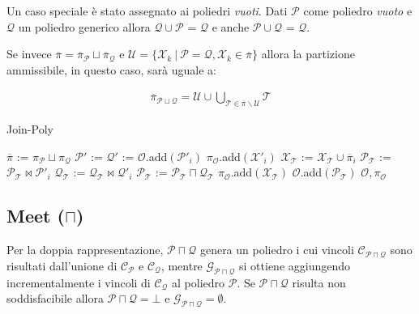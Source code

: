 \documentclass{mimosis}
\theoremstyle{definition}
\begin{document}
Un caso speciale è stato assegnato ai poliedri \emph{vuoti}. Dati \(\mathcal{P}\) come
poliedro \emph{vuoto} e \(\mathcal{Q}\) un poliedro generico allora \(\mathcal{Q} \cup
\mathcal{P}\) = \(\mathcal{Q}\) e anche \(\mathcal{P} \cup
\mathcal{Q}\) = \(\mathcal{Q}\).

Se invece \(\overline{\pi} = \overline{\pi}_{\mathcal{P}} \sqcup
\overline{\pi}_{\mathcal{Q}}\) e \(\mathcal{U} = \{\mathcal{X}_k \: | \: \mathcal{P}
= \mathcal{Q}, \mathcal{X}_k \in \overline{\pi} \}\) allora la partizione
ammissibile, in questo caso, sarà uguale a:

\begin{align*}
\overline{\pi}_{\mathcal{P} \sqcup \mathcal{Q}} = \mathcal{U} \cup \bigcup_{\mathcal{T} \in \overline{\pi} \backslash \mathcal{U}} \mathcal{T}
\end{align*}

\begin{algorithm}[H]
\caption{Join-Poly}\label{join-poly}
\begin{algorithmic}[1]
\State$\overline{\pi}$ := $\pi_{\mathcal{P}} \sqcup \pi_{\mathcal{Q}}$
\State$\mathcal{P}'$ := 
\State$\mathcal{Q}'$ := 
\State$\mathcal{O}$.add$(\mathcal{P}'_{i})$
\State$\pi_{\mathcal{O}}$.add$(\mathcal{X}'_{i})$
\Else
\State$\mathcal{X}_{\mathcal{T}}$ := $\mathcal{X}_{\mathcal{T}} \cup \overline{\pi}_{i}$
\State$\mathcal{P}_{\mathcal{T}}$ := $\mathcal{P}_{\mathcal{T}} \bowtie \mathcal{P}'_{i}$
\State$\mathcal{Q}_{\mathcal{T}}$ := $\mathcal{Q}_{\mathcal{T}} \bowtie \mathcal{Q}'_{i}$
\EndIf
\EndFor
\State$\mathcal{P}_{\mathcal{T}}$ := $\mathcal{P}_{\mathcal{T}} \sqcap \mathcal{Q}_{\mathcal{T}}$
\State$\pi_{\mathcal{O}}$.add$(\mathcal{X}_{\mathcal{T}})$
\State$\mathcal{O}$.add$(\mathcal{P}_{\mathcal{T}})$
\State\Return$\mathcal{O}, \pi_{\mathcal{O}}$
\EndFunction
\end{algorithmic}
\end{algorithm}

\subsection{Meet (\(\sqcap\))}
\label{sec:org04fbf9f}
Per la doppia rappresentazione, \(\mathcal{P} \sqcap \mathcal{Q}\) genera un
poliedro i cui vincoli \(\mathcal{C}_{\mathcal{P} \sqcap \mathcal{Q}}\) sono
risultati dall'unione di \(\mathcal{C}_{\mathcal{P}}\) e
\(\mathcal{C}_{\mathcal{Q}}\), mentre \(\mathcal{G}_{\mathcal{P} \sqcap
\mathcal{Q}}\) si ottiene aggiungendo incrementalmente i vincoli di
\(\mathcal{C}_{\mathcal{Q}}\) al poliedro \(\mathcal{P}\). Se \(\mathcal{P} \sqcap
\mathcal{Q}\) risulta non soddisfacibile allora \(\mathcal{P} \sqcap \mathcal{Q} =
\bot\) e \(\mathcal{G}_{\mathcal{P} \sqcap \mathcal{Q}} = \emptyset\).
\end{document}
